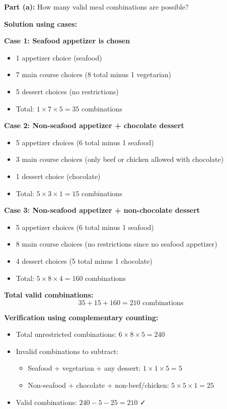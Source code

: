 \documentclass[
  11pt,
]{article}
\begin{document}
\textbf{Part (a):} How many valid meal combinations are possible?

\textbf{Solution using cases:}

\textbf{Case 1: Seafood appetizer is chosen}

\begin{itemize}
\item
  1 appetizer choice (seafood)
\item
  7 main course choices (8 total minus 1 vegetarian)
\item
  5 dessert choices (no restrictions)
\item
  Total: \(1 \times 7 \times 5 = 35\) combinations
\end{itemize}

\textbf{Case 2: Non-seafood appetizer + chocolate dessert}

\begin{itemize}
\item
  5 appetizer choices (6 total minus 1 seafood)
\item
  3 main course choices (only beef or chicken allowed with chocolate)
\item
  1 dessert choice (chocolate)
\item
  Total: \(5 \times 3 \times 1 = 15\) combinations
\end{itemize}

\textbf{Case 3: Non-seafood appetizer + non-chocolate dessert}

\begin{itemize}
\item
  5 appetizer choices (6 total minus 1 seafood)
\item
  8 main course choices (no restrictions since no seafood appetizer)
\item
  4 dessert choices (5 total minus 1 chocolate)
\item
  Total: \(5 \times 8 \times 4 = 160\) combinations
\end{itemize}

\textbf{Total valid combinations:}
\[35 + 15 + 160 = \boxed{210 \text{ combinations}}\]

\textbf{Verification using complementary counting:}

\begin{itemize}
\item
  Total unrestricted combinations: \(6 \times 8 \times 5 = 240\)
\item
  Invalid combinations to subtract:

  \begin{itemize}
  \item
    Seafood + vegetarian + any dessert: \(1 \times 1 \times 5 = 5\)
  \item
    Non-seafood + chocolate + non-beef/chicken:
    \(5 \times 5 \times 1 = 25\)
  \end{itemize}
\item
  Valid combinations: \(240 - 5 - 25 = 210\) ✓
\end{itemize}
\end{document}
